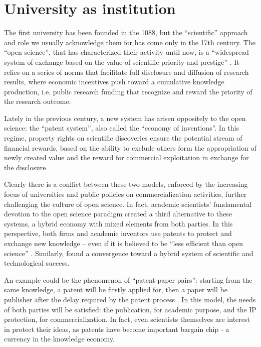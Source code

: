 

\label{Chapter2} %


\section{University as institution}
The first university has been founded in the 1088, but the \enquote{scientific} approach and role we usually acknowledge them for has come only in the 17th century. The \enquote{open science}, that has characterized their activity until now, is a \enquote{widespread system of exchange based on the value of scientific priority and prestige} \citep{Murray2005}. It relies on a series of norms that facilitate full disclosure and diffusion of research results, where economic incentives push toward a cumulative knowledge production, i.e. public research funding that recognize and reward the priority of the research outcome.

Lately in the previous century, a new system has arisen oppositely to the open science: the \enquote{patent system}, also called the \enquote{economy of inventions}. In this regime, property rights on scientific discoveries ensure the potential stream of financial rewards, based on the ability to exclude others form the appropriation of newly created value and the reward for commercial exploitation in exchange for the disclosure. 

Clearly there is a conflict between these two models, enforced by the increasing focus of universities and public policies on commercialization activities, further challenging the culture of open science. In fact, academic scientists' fundamental devotion to the open science paradigm created a third alternative to these systems, a hybrid economy with mixed elements from both parties. In this perspective, both firms and academic inventors use patents to protect and exchange new knowledge – even if it is believed to be \enquote{less efficient than open science} \citep{Geuna2009}. Similarly, \citet{OwenSmith2001} found a convergence toward a hybrid system of scientific and technological success.

An example could be the phenomenon of \enquote{patent-paper pairs}: starting from the same knowledge, a patent will be firstly applied for, then a paper will be publisher after the delay required by the patent process \citep{Murray2005}. In this model, the needs of both parties will be satisfied: the publication, for academic purpose, and the IP protection, for commercialization. In fact, even scientists themselves are interest in protect their ideas, as patents have become important bargain chip - a currency in the knowledge economy.

